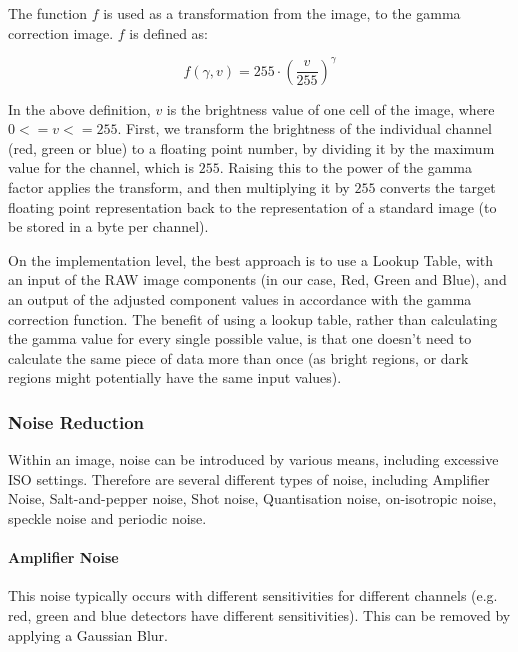 \documentclass[10pt,a4paper]{article}
\begin{document}
The function $f$ is used as a transformation from the image, to the gamma correction image. $f$ is defined as:

$$f(\gamma, v) = 255 \cdot \left( \frac{v}{255}\right)^{\gamma} $$

In the above definition, $v$ is the brightness value of one cell of the image, where $0 <= v <= 255$. First, we transform the
brightness of the individual channel (red, green or blue) to a floating point number, by dividing it by the maximum value for
the channel, which is $255$. Raising this to the power of the gamma factor applies the transform, and then multiplying it by $255$ converts the
target floating point representation back to the representation of a standard image (to be stored in a byte per channel).

On the implementation level, the best approach is to use a Lookup Table, with an input of the RAW image components (in our case, Red, Green and Blue),
and an output of the adjusted component values in accordance with the gamma correction function. The benefit of using a lookup table, rather than calculating
the gamma value for every single possible value, is that one doesn't need to calculate the same piece of data more than once (as bright regions, or dark regions might
potentially have the same input values). 

\subsubsection{Noise Reduction}
Within an image, noise can be introduced by various means, including excessive ISO settings. Therefore are several different
types of noise, including Amplifier Noise, Salt-and-pepper noise, Shot noise, Quantisation noise, on-isotropic noise, speckle noise
and periodic noise. 
\cite{NRandFiltering}



\paragraph{Amplifier Noise}
    This noise typically occurs with different sensitivities for different channels (e.g. red, green and blue detectors have
    different sensitivities). \cite{NRandFiltering}
    This can be removed by applying a Gaussian Blur. \cite{DigitalImageProcessingTextbook}
\end{document}
